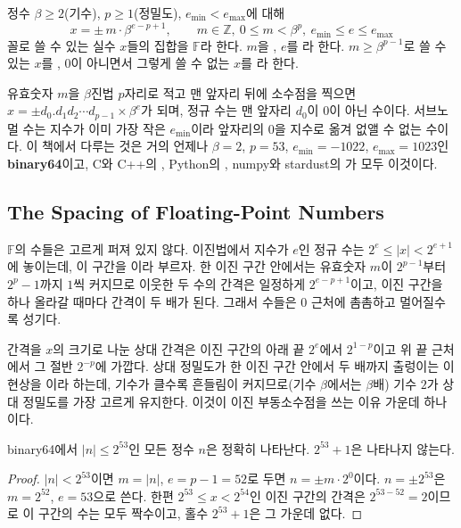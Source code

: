 \begin{definition}[부동소수점 수]
\label{def:fp-set}
정수 $\beta\ge2$(기수), $p\ge1$(정밀도), $e_{\min}<e_{\max}$에 대해
\[
x=\pm\,m\cdot\beta^{e-p+1},\qquad m\in\mathbb Z,\ 0\le m<\beta^p,\ e_{\min}\le e\le e_{\max}
\]
꼴로 쓸 수 있는 실수 $x$들의 집합을 $\mathbb F$라 한다. $m$을 , $e$를 라 한다. $m\ge\beta^{p-1}$로 쓸 수 있는 $x$를 , $0$이 아니면서 그렇게 쓸 수 없는 $x$를 라 한다.
\end{definition}

유효숫자 $m$을 $\beta$진법 $p$자리로 적고 맨 앞자리 뒤에 소수점을 찍으면 $x=\pm d_0.d_1d_2\cdots d_{p-1}\times\beta^e$가 되며, 정규 수는 맨 앞자리 $d_0$이 $0$이 아닌 수이다. 서브노멀 수는 지수가 이미 가장 작은 $e_{\min}$이라 앞자리의 $0$을 지수로 옮겨 없앨 수 없는 수이다. 이 책에서 다루는 것은 거의 언제나 $\beta=2$, $p=53$, $e_{\min}=-1022$, $e_{\max}=1023$인 \textbf{binary64}이고, C와 C++의 , Python의 , numpy와 stardust의 가 모두 이것이다\cite{ieee754-2019}.

\subsection{The Spacing of Floating-Point Numbers}

$\mathbb F$의 수들은 고르게 퍼져 있지 않다. 이진법에서 지수가 $e$인 정규 수는 $2^e\le|x|<2^{e+1}$에 놓이는데, 이 구간을 이라 부르자. 한 이진 구간 안에서는 유효숫자 $m$이 $2^{p-1}$부터 $2^p-1$까지 $1$씩 커지므로 이웃한 두 수의 간격은 일정하게 $2^{e-p+1}$이고, 이진 구간을 하나 올라갈 때마다 간격이 두 배가 된다. 그래서 수들은 $0$ 근처에 촘촘하고 멀어질수록 성기다.

간격을 $x$의 크기로 나눈 상대 간격은 이진 구간의 아래 끝 $2^e$에서 $2^{1-p}$이고 위 끝 근처에서 그 절반 $2^{-p}$에 가깝다. 상대 정밀도가 한 이진 구간 안에서 두 배까지 출렁이는 이 현상을 이라 하는데, 기수가 클수록 흔들림이 커지므로(기수 $\beta$에서는 $\beta$배) 기수 $2$가 상대 정밀도를 가장 고르게 유지한다. 이것이 이진 부동소수점을 쓰는 이유 가운데 하나이다\cite{goldberg1991}.

\begin{proposition}
\label{prop:fp-integers}
binary64에서 $|n|\le2^{53}$인 모든 정수 $n$은 정확히 나타난다. $2^{53}+1$은 나타나지 않는다.
\end{proposition}

\begin{proof}
$|n|<2^{53}$이면 $m=|n|$, $e=p-1=52$로 두면 $n=\pm m\cdot2^0$이다. $n=\pm2^{53}$은 $m=2^{52}$, $e=53$으로 쓴다. 한편 $2^{53}\le x<2^{54}$인 이진 구간의 간격은 $2^{53-52}=2$이므로 이 구간의 수는 모두 짝수이고, 홀수 $2^{53}+1$은 그 가운데 없다.
\end{proof}

